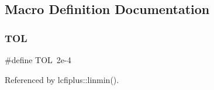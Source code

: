 \subsection{Macro Definition Documentation}
\mbox{\label{algo_8cc_a156b862ebf6d213f5da19b9e3ccb779e}} 
\subsubsection{T\+OL}
{\footnotesize\ttfamily \#define T\+OL~2e-\/4}



Referenced by lcfiplus\+::linmin().

